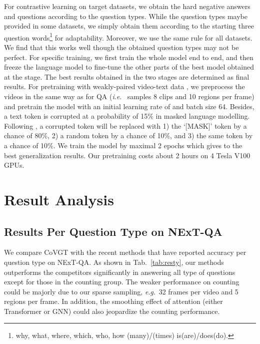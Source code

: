 \documentclass[10pt,journal,compsoc]{IEEEtran}
\newcommand{\ie}{\textit{i}.\textit{e}.}
\newcommand{\eg}{\textit{e}.\textit{g}.}
\begin{document}
For contrastive learning on target datasets, we obtain the hard negative answers and questions according to the question types. While the question types maybe provided in some datasets, we simply obtain them according to the starting three question words\footnote{why, what, where, which, who, how (many)/(times)  is(are)/does(do).} for adaptability. Moreover, we use the same rule for all datasets. We find that this works well though the obtained question types may not be perfect. For specific training, we first train the whole model end to end, and then freeze the language model to fine-tune the other parts of the best model obtained at the  stage. The best results obtained in the two stages are determined as final results. 
For pretraining with weakly-paired video-text data \cite{bain2021frozen}, we preprocess the videos in the same way as for QA (\ie~ samples 8 clips and 10 regions per frame) and pretrain the model with an initial learning rate of  and batch size 64. Besides, a text token is corrupted at a probability of 15\% in masked language modelling. Following \cite{liu2019roberta,yang2021just}, a corrupted token will be replaced with 1) the `[MASK]' token by a chance of 80\%, 2) a random token by a chance of 10\%, and 3) the same token by a chance of 10\%. We train the model by maximal 2 epochs which gives to the best generalization results. Our pretraining costs about 2 hours on 4 Tesla V100 GPUs.

\section{Result Analysis}
\subsection{Results Per Question Type on NExT-QA}
\label{app:comp}
We compare CoVGT with the recent methods that have reported accuracy per question type on NExT-QA. As shown in Tab.~\ref{tab:resty}, our methods outperforms the competitors significantly in answering all type of questions except for those in the counting group. The weaker performance on counting could be majorly due to our sparse sampling, \eg~32 frames per video and 5 regions per frame. In addition, the smoothing effect of attention (either Transformer or GNN) could also jeopardize the counting performance.
\end{document}
